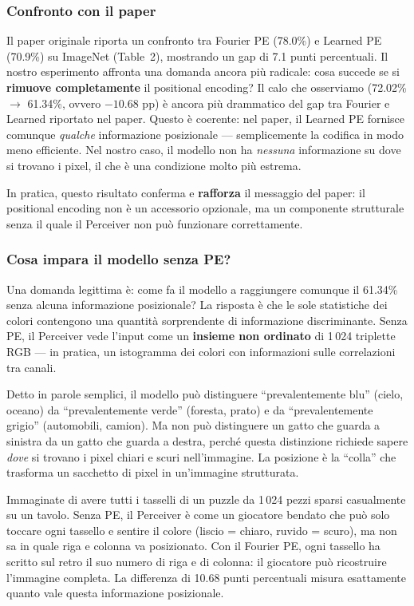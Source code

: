 \documentclass[12pt,a4paper]{article}
\begin{document}
\subsubsection{Confronto con il paper}

Il paper originale riporta un confronto tra Fourier PE (78.0\%) e Learned PE (70.9\%) su ImageNet (Table~2), mostrando un gap di 7.1 punti percentuali. Il nostro esperimento affronta una domanda ancora pi\`u radicale: cosa succede se si \textbf{rimuove completamente} il positional encoding? Il calo che osserviamo (72.02\% $\to$ 61.34\%, ovvero $-10.68$ pp) \`e ancora pi\`u drammatico del gap tra Fourier e Learned riportato nel paper. Questo \`e coerente: nel paper, il Learned PE fornisce comunque \emph{qualche} informazione posizionale --- semplicemente la codifica in modo meno efficiente. Nel nostro caso, il modello non ha \emph{nessuna} informazione su dove si trovano i pixel, il che \`e una condizione molto pi\`u estrema.

In pratica, questo risultato conferma e \textbf{rafforza} il messaggio del paper: il positional encoding non \`e un accessorio opzionale, ma un componente strutturale senza il quale il Perceiver non pu\`o funzionare correttamente.

\subsubsection{Cosa impara il modello senza PE?}

Una domanda legittima \`e: come fa il modello a raggiungere comunque il 61.34\% senza alcuna informazione posizionale? La risposta \`e che le sole statistiche dei colori contengono una quantit\`a sorprendente di informazione discriminante. Senza PE, il Perceiver vede l'input come un \textbf{insieme non ordinato} di 1\,024 triplette RGB --- in pratica, un istogramma dei colori con informazioni sulle correlazioni tra canali.

Detto in parole semplici, il modello pu\`o distinguere ``prevalentemente blu'' (cielo, oceano) da ``prevalentemente verde'' (foresta, prato) e da ``prevalentemente grigio'' (automobili, camion). Ma non pu\`o distinguere un gatto che guarda a sinistra da un gatto che guarda a destra, perch\'e questa distinzione richiede sapere \textit{dove} si trovano i pixel chiari e scuri nell'immagine. La posizione \`e la ``colla'' che trasforma un sacchetto di pixel in un'immagine strutturata.

\begin{notabox}
Immaginate di avere tutti i tasselli di un puzzle da 1\,024 pezzi sparsi casualmente su un tavolo. Senza PE, il Perceiver \`e come un giocatore bendato che pu\`o solo toccare ogni tassello e sentire il colore (liscio = chiaro, ruvido = scuro), ma non sa in quale riga e colonna va posizionato. Con il Fourier PE, ogni tassello ha scritto sul retro il suo numero di riga e di colonna: il giocatore pu\`o ricostruire l'immagine completa. La differenza di 10.68 punti percentuali misura esattamente quanto vale questa informazione posizionale.
\end{notabox}
\end{document}
